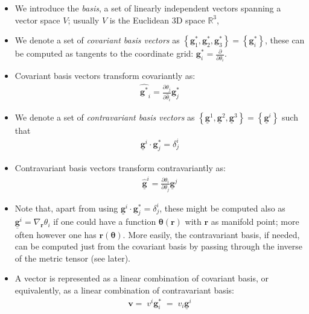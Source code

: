 \documentclass{digitaldynamics}
\def\vect#1{\bm{#1}}
\def\vcovar#1{{\bm{#1}}^*}
\def\vcontr#1{\underline{\bm{#1}}}
\begin{document}
\begin{itemize}

\item We introduce the \textit{basis}, a set of linearly independent vectors spanning a vector space $V$; usually $V$ is the Euclidean 3D space $\mathbb{R}^3$,

\item We denote a set of \textit{covariant basis vectors} as $\left\{ \vcovar{g}_1, \vcovar{g}_2, \vcovar{g}_3 \right\} = \left\{ \vcovar{g}_i \right\}$, these can be computed as tangents to the coordinate grid: $\vcovar{g}_i = \frac{\partial}{\partial \theta_i}$.

\item Covariant basis vectors transform covariantly as: 
\begin{align*}
	\hat{\vcovar{g}}_i = \frac{\partial {\theta}_j}{\partial \hat{\theta}_i} \vcovar{g}_j
	\label{eq:basiscovariant}
\end{align*}

\item We denote a set of \textit{contravariant basis vectors} as $\left\{ \vcontr{g}^1, \vcontr{g}^2, \vcontr{g}^3 \right\} = \left\{ \vcontr{g}^i \right\}$
such that 
\begin{align}
  \vcontr{g}^i \cdot \vcovar{g}_j = \delta^i_j
\end{align}

\item Contravariant basis vectors transform contravariantly as: 
\begin{align}
	\hat{\vcontr{g}}^i = \frac{\partial \hat{\theta}_i}{\partial \theta_j} \vcontr{g}^j 
	\label{eq:basiscontravariant}
\end{align}

\item Note that, apart from using $\vcontr{g}^i \cdot \vcovar{g}_j = \delta^i_j$, these might be computed also as $\vcontr{g}^i = \nabla_{\vect{r}} \theta_i$ if one could have a function $\vect{\theta}(\vect{r})$ with $\vect{r}$ as manifold point; more often however one has $\vect{r}(\vect{\theta})$. More easily, the contravariant basis, if needed, can be computed just from the covariant basis by passing through the inverse of the metric tensor (see later).



\item A vector is represented as a linear combination of covariant basis, or equivalently, as a linear combination of contravariant basis:
\begin{align*}
	\vect{v} = \; v^i \vcovar{g}_i \; = \; v_i \vcontr{g}^i 
\end{align*}
	

\end{itemize}
\end{document}
